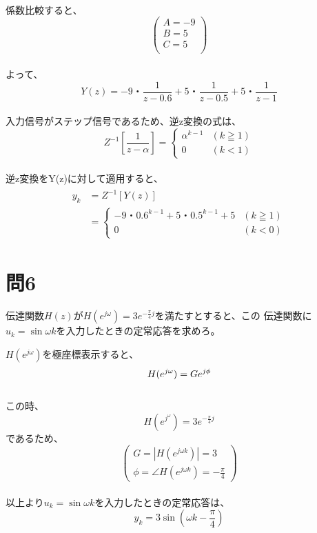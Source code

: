 \documentclass[a4paper,11pt]{ltjsarticle}
\begin{document}
\\係数比較すると、
\begin{equation*}
  \begin{pmatrix}
    A = -9 \\
    B = 5 \\
    C = 5 \\
  \end{pmatrix}
\end{equation*}
\\よって、
\begin{equation*}
  Y(z) = -9・\frac{1}{z-0.6} + 5・\frac{1}{z-0.5} + 5・\frac{1}{z-1}
\end{equation*}
\\入力信号がステップ信号であるため、逆z変換の式は、
\begin{equation*}
  Z^{-1}\left[\frac{1}{z-\alpha}\right] =
  \begin{cases*}
    \alpha^{k-1} & (k \geqq 1) \\
    0 & (k < 1)
  \end{cases*}
\end{equation*}
\\逆z変換をY(z)に対して適用すると、
\begin{gather*}
  \begin{split}
    y_{k} 
    &= Z^{-1}[Y(z)] \\
    &=
    \begin{cases*}
      -9・0.6^{k-1} + 5・0.5^{k-1} + 5 & (k \geqq 1) \\
      0 & (k < 0)
    \end{cases*}
  \end{split}
\end{gather*}
\section*{問6}
伝達関数$H(z)$が$H(e^{j\omega}) = 3e^{-\frac{\pi}{4}j}$を満たすとすると、この
伝達関数に$u_{k}=\sin\omega k$を入力したときの定常応答を求めろ。


$H(e^{j\omega})$を極座標表示すると、
\begin{equation*}
  H(e^{j\omega}) = Ge^{j\phi}\\
\end{equation*}
\\この時、
\begin{equation*}
  H(e^{j^\omega}) = 3e^{-\frac{\pi}{4}j}
\end{equation*}
であるため、
\begin{equation*}
  \begin{pmatrix}
    G = |H(e^{j\omega k})| = 3 \\
    \phi = \angle H(e^{j \omega k}) = -\frac{\pi}{4}
  \end{pmatrix}
\end{equation*}
  \\以上より$u_{k} = \sin\omega k$を入力したときの定常応答は、
  \begin{equation*}
    y_{k} = 3 \sin (\omega k - \frac{\pi}{4})
  \end{equation*}
\end{document}
